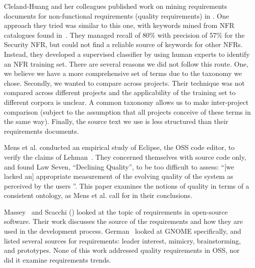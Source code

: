 \documentclass[10pt, conference, compsocconf]{IEEEtran}
\begin{document}
Cleland-Huang and her colleagues published work on mining requirements documents for non-functional requirements (quality requirements) in \cite{Cleland-Huang2006}. One approach they tried was similar to this one, with keywords mined from NFR catalogues found in~\cite{chung99}. They managed recall of 80\% with precision of 57\% for the Security NFR, but could not find a reliable source of keywords for other NFRs. Instead, they developed a supervised classifier by using human experts to identify an NFR training set. There are several reasons we did not follow this route. One, we believe we have a more comprehensive set of terms due to the taxonomy we chose. Secondly, we wanted to compare across projects. Their technique was not compared across different projects and the applicability of the training set to different corpora is unclear. A common taxonomy allows us to make inter-project comparison (subject to the assumption that all projects conceive of these terms in the same way). %
Finally, the source text we use is less structured than their requirements documents.


Mens et al. \cite{mens08icsm} conducted an empirical study of Eclipse, the OSS code editor, to verify the claims of Lehman~\cite{lehman97sms}. They concerned themselves with source code only, and found Law Seven, ``Declining Quality'', to be too difficult to assess: ``[we lacked an] appropriate measurement of the evolving quality of the system as perceived by the users \cite[p. 388]{mens08icsm}''. This paper examines the notions of quality in terms of a consistent ontology, as Mens et al. call for in their conclusions.

	 Massey~\cite{massey02icse} and Scacchi (\cite{scacchi02,scacchi05b}) looked at the topic of requirements in open-source software. Their work discusses the source of the requirements and how they are used in the development process. German~\cite{german03gnome} looked at GNOME specifically, and listed several sources for requirements: leader interest, mimicry, brainstorming, and prototypes. None of this work  addressed quality requirements in OSS, nor did it examine requirements trends.
\end{document}
